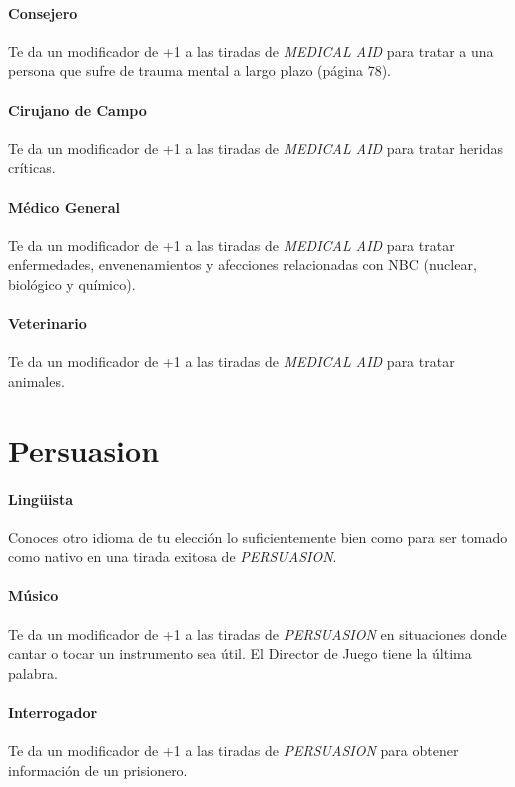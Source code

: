     \paragraph{Consejero}
    Te da un modificador de +1 a las tiradas de \emph{MEDICAL AID} para tratar a una persona que sufre de trauma mental a largo plazo (página 78).

    \paragraph{Cirujano de Campo}
    Te da un modificador de +1 a las tiradas de \emph{MEDICAL AID} para tratar heridas críticas.

    \paragraph{Médico General}
    Te da un modificador de +1 a las tiradas de \emph{MEDICAL AID} para tratar enfermedades, envenenamientos y afecciones relacionadas con NBC (nuclear, biológico y químico).

    \paragraph{Veterinario}
    Te da un modificador de +1 a las tiradas de \emph{MEDICAL AID} para tratar animales.

\section{Persuasion}

    \paragraph{Lingüista}
    Conoces otro idioma de tu elección lo suficientemente bien como para ser tomado como nativo en una tirada exitosa de \emph{PERSUASION}.

    \paragraph{Músico}
    Te da un modificador de +1 a las tiradas de \emph{PERSUASION} en situaciones donde cantar o tocar un instrumento sea útil. El Director de Juego tiene la última palabra.

    \paragraph{Interrogador}
    Te da un modificador de +1 a las tiradas de \emph{PERSUASION} para obtener información de un prisionero.

